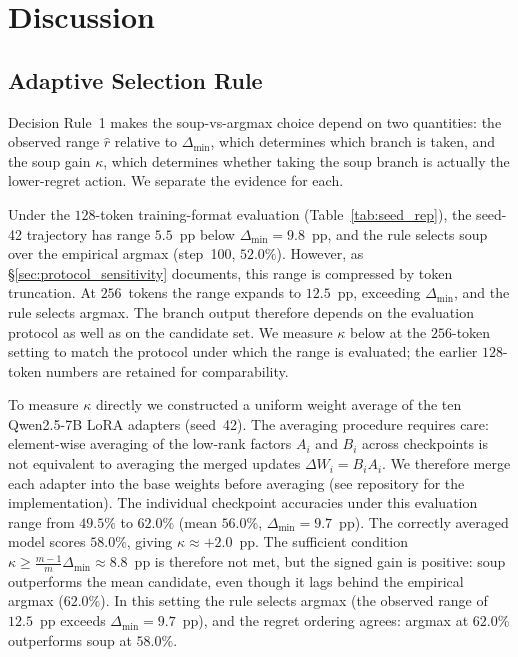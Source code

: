 \documentclass[pdflatex,sn-mathphys-ay,oneside]{sn-jnl}
\theoremstyle{thmstylethree}
\begin{document}
\section{Discussion}\label{sec:discussion}

\subsection{Adaptive Selection Rule}\label{sec:adaptive}

Decision Rule~1 makes the soup-vs-argmax choice depend on two quantities: the observed range $\hat r$ relative to $\Delta_{\min}$, which determines which branch is taken, and the soup gain $\kappa$, which determines whether taking the soup branch is actually the lower-regret action. We separate the evidence for each.

Under the $128$-token training-format evaluation (Table~\ref{tab:seed_rep}), the seed-42 trajectory has range $5.5$~pp below $\Delta_{\min}=9.8$~pp, and the rule selects soup over the empirical argmax (step~100, $52.0\%$). However, as \S\ref{sec:protocol_sensitivity} documents, this range is compressed by token truncation. At $256$~tokens the range expands to $12.5$~pp, exceeding $\Delta_{\min}$, and the rule selects argmax. The branch output therefore depends on the evaluation protocol as well as on the candidate set. We measure $\kappa$ below at the $256$-token setting to match the protocol under which the range is evaluated; the earlier $128$-token numbers are retained for comparability.

To measure $\kappa$ directly we constructed a uniform weight average of the ten Qwen2.5-7B LoRA adapters (seed~42). The averaging procedure requires care: element-wise averaging of the low-rank factors $A_i$ and $B_i$ across checkpoints is not equivalent to averaging the merged updates $\Delta W_i = B_iA_i$. We therefore merge each adapter into the base weights before averaging (see repository for the implementation). The individual checkpoint accuracies under this evaluation range from $49.5\%$ to $62.0\%$ (mean $56.0\%$, $\Delta_{\min}=9.7$~pp). The correctly averaged model scores $58.0\%$, giving $\kappa \approx +2.0$~pp. The sufficient condition $\kappa \geq \frac{m-1}{m}\Delta_{\min} \approx 8.8$~pp is therefore not met, but the signed gain is positive: soup outperforms the mean candidate, even though it lags behind the empirical argmax ($62.0\%$). In this setting the rule selects argmax (the observed range of $12.5$~pp exceeds $\Delta_{\min}=9.7$~pp), and the regret ordering agrees: argmax at $62.0\%$ outperforms soup at $58.0\%$.
\end{document}
